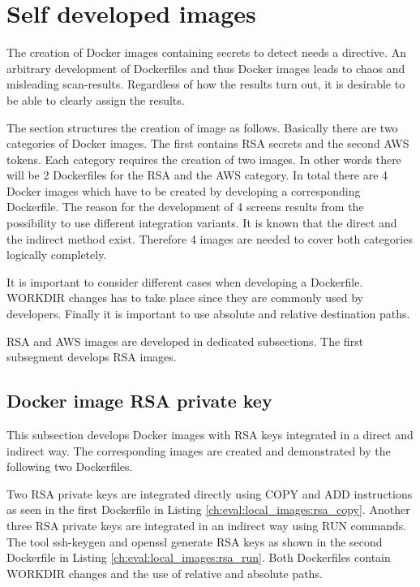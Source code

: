 \section{Self developed images}
\label{ch:eval:local_images}
The creation of Docker images containing secrets to detect needs a directive. An arbitrary development of Dockerfiles and thus Docker images leads to chaos and misleading scan-results. 
Regardless of how the results turn out, it is desirable to be able to clearly assign the results.

The section structures the creation of image as follows. Basically there are two categories of Docker images. The first contains RSA secrets and the second AWS tokens. Each category requires the creation of two images. In other words there will be 2 Dockerfiles for the RSA and the AWS category. 
In total there are 4 Docker images which have to be created by developing a corresponding Dockerfile. 
The reason for the development of 4 screens results from the possibility to use different integration variants.
It is known that the direct and the indirect method exist. Therefore 4 images are needed to cover both categories logically completely.

It is important to consider different cases when developing a Dockerfile. WORKDIR changes has to take place since they are commonly used by developers. Finally it is important to use absolute and relative destination paths. 

RSA and AWS images are developed in dedicated subsections. The first subsegment develops RSA images.

\subsection{Docker image RSA private key}
\label{ch:eval:local_images:rsa}
This subsection develops Docker images with RSA keys integrated in a direct and indirect way. The corresponding images are created and demonstrated by the following two Dockerfiles.


Two RSA private keys are integrated directly using COPY and ADD instructions as seen in the first Dockerfile in Listing \ref{ch:eval:local_images:rsa_copy}. 
Another three RSA private keys are integrated in an indirect way using RUN commands. The tool ssh-keygen and openssl generate RSA keys as shown in the second Dockerfile in Listing \ref{ch:eval:local_images:rsa_run}. 
Both Dockerfiles contain WORKDIR changes and the use of relative and absolute paths. 

